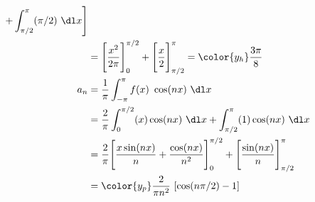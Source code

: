 \begin{enumerate}
\begin{align}
              + \int_{\pi/2}^{\pi} (\pi/2)\ \dl x \Bigg]                    \\
                  & =  \Bigg[ \frac{x^2}{2\pi} \Bigg]_{0}^{\pi/2}
              + \Bigg[ \frac{x}{2} \Bigg]_{\pi/2}^{\pi}
              = \color{y_h} \frac{3\pi}{8}                                  \\
              a_n & = \frac{1}{\pi} \int_{-\pi}^{\pi} f(x)\ \cos(nx)\ \dl x \\
                  & = \frac{2}{\pi} \int_{0}^{\pi/2} (x) \cos(nx)\ \dl x
              + \int_{\pi/2}^{\pi} (1) \cos(nx)\ \dl x                      \\
                  & = \frac{2}{\pi}\Bigg[ \frac{x \sin(nx)}{n}
                  + \frac{\cos(nx)}{n^2}\Bigg]_{0}^{\pi/2} +
              \Bigg[ \frac{\sin(nx)}{n} \Bigg]_{\pi/2}^{\pi}                \\
                  & = \color{y_p} \frac{2}{\pi n^2}\ [\cos(n\pi/2) - 1]
          \end{align}


\end{enumerate}
